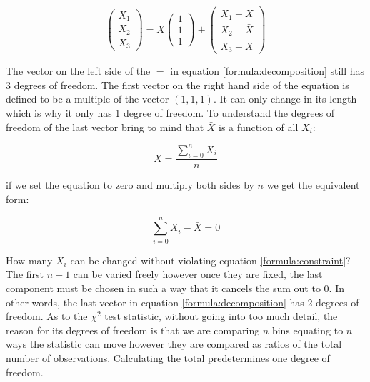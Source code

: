 \documentclass{tufte-book} %
\begin{document}
\begin{equation}
\left(
\begin{array}{c}
X_1 \\
X_2 \\
X_3 
\end{array}
\right)
=
\bar{X}
\left(
\begin{array}{c}
1 \\
1 \\
1 
\end{array}
\right)
+
\left(
\begin{array}{c}
X_1 - \bar{X} \\
X_2 - \bar{X} \\
X_3 - \bar{X} 
\end{array}
\right)
\label{formula:decomposition}
\end{equation}

The vector on the left side of the $=$ in equation \ref{formula:decomposition} still has 3 degrees of freedom. The first vector on the right hand side of the equation is defined to be a multiple of the vector $(1, 1, 1)$. It can only change in its length which is why it only has 1 degree of freedom. To understand the degrees of freedom of the last vector bring to mind that $\bar{X}$ is a function of all $X_i$:

\begin{equation}
\bar{X} = \frac{\sum_{i = 0}^n X_i}{n}
\end{equation}

if we set the equation to zero and multiply both sides by $n$ we get the equivalent form:

\begin{equation}
\sum_{i = 0}^n X_i - \bar{X} = 0
\label{formula:constraint}
\end{equation}

How many $X_i$ can be changed without violating equation \ref{formula:constraint}? The first $n-1$ can be varied freely however once they are fixed, the last component must be chosen in such a way that it cancels the sum out to 0. In other words, the last vector in equation \ref{formula:decomposition} has 2 degrees of freedom. As to the $\chi^2$ test statistic, without going into too much detail, the reason for its degrees of freedom is that we are comparing $n$ bins equating to $n$ ways the statistic can move however they are compared as ratios of the total number of observations. Calculating the total predetermines one degree of freedom.



\backmatter




\printindex %
\end{document}
